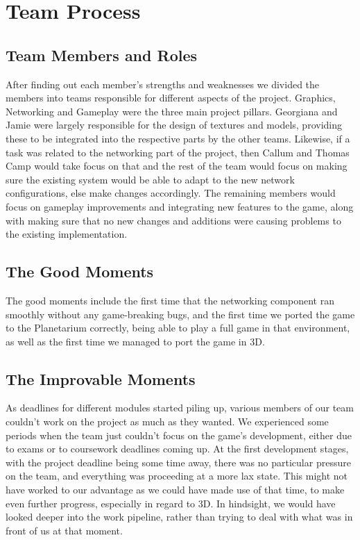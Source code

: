 \documentclass[11pt,a4paper]{article}
\begin{document}
        \section{Team Process}
        
        \subsection{Team Members and Roles}

After finding out each member's strengths and weaknesses we divided the members into teams responsible for different aspects of the project. Graphics, Networking and Gameplay were the three main project pillars. Georgiana and Jamie were largely responsible for the design of textures and models, providing these to be integrated into the respective parts by the other teams. Likewise, if a task was related to the networking part of the project, then Callum and Thomas Camp would take focus on that and the rest of the team would focus on making sure the existing system would be able to adapt to the new network configurations, else make changes accordingly. The remaining members would focus on gameplay improvements and integrating new features to the game, along with making sure that no new changes and additions were causing problems to the existing implementation.
         
         
 \subsection{The Good Moments}
        The good moments include the first time that the networking component ran smoothly without any game-breaking bugs, and the first time we ported the game to the Planetarium correctly, being able to play a full game in that environment, as well as the first time we managed to port the game in 3D.

        \subsection{The Improvable Moments}
        As deadlines for different modules started piling up, various members of our team couldn't work on the project as much as they wanted. We experienced some periods when the team just couldn't focus on the game's development, either due to exams or to coursework deadlines coming up.
        At the first development stages, with the project deadline being some time away, there was no particular pressure on the team, and everything was proceeding at a more lax state. This might not have worked to our advantage as we could have made use of that time, to make even further progress, especially in regard to 3D. In hindsight, we would have looked deeper into the work pipeline, rather than trying to deal with what was in front of us at that moment.  
\end{document}
